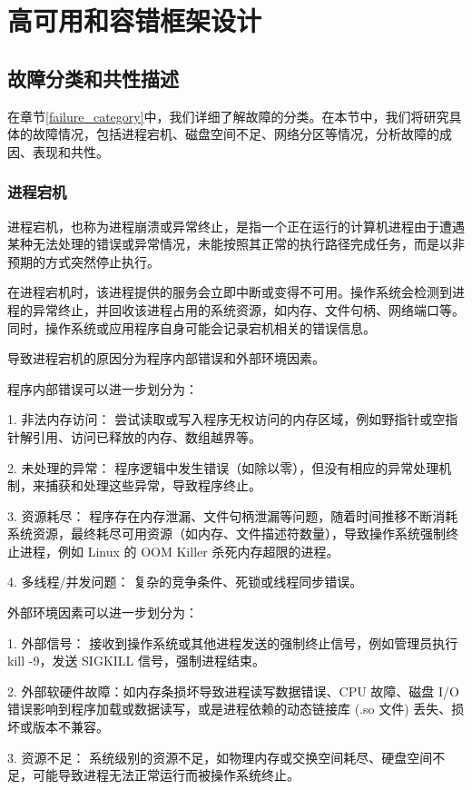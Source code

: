 
\chapter{高可用和容错框架设计}


\section{故障分类和共性描述}

在章节\ref{failure_category}中，我们详细了解故障的分类。在本节中，我们将研究具体的故障情况，包括进程宕机、磁盘空间不足、网络分区等情况，分析故障的成因、表现和共性。

\subsection{进程宕机}

进程宕机，也称为进程崩溃或异常终止，是指一个正在运行的计算机进程由于遭遇某种无法处理的错误或异常情况，未能按照其正常的执行路径完成任务，而是以非预期的方式突然停止执行。

在进程宕机时，该进程提供的服务会立即中断或变得不可用。操作系统会检测到进程的异常终止，并回收该进程占用的系统资源，如内存、文件句柄、网络端口等。同时，操作系统或应用程序自身可能会记录宕机相关的错误信息。

导致进程宕机的原因分为程序内部错误和外部环境因素。

程序内部错误可以进一步划分为：
 
1. 非法内存访问： 尝试读取或写入程序无权访问的内存区域，例如野指针或空指针解引用、访问已释放的内存、数组越界等。

2. 未处理的异常： 程序逻辑中发生错误（如除以零），但没有相应的异常处理机制，来捕获和处理这些异常，导致程序终止。

3. 资源耗尽： 程序存在内存泄漏、文件句柄泄漏等问题，随着时间推移不断消耗系统资源，最终耗尽可用资源（如内存、文件描述符数量），导致操作系统强制终止进程，例如 Linux 的 OOM Killer 杀死内存超限的进程。

4. 多线程/并发问题： 复杂的竞争条件、死锁或线程同步错误。

外部环境因素可以进一步划分为：

1. 外部信号： 接收到操作系统或其他进程发送的强制终止信号，例如管理员执行 kill -9，发送 SIGKILL 信号，强制进程结束。

2. 外部软硬件故障：如内存条损坏导致进程读写数据错误、CPU 故障、磁盘 I/O 错误影响到程序加载或数据读写，或是进程依赖的动态链接库 (.so 文件) 丢失、损坏或版本不兼容。

3. 资源不足： 系统级别的资源不足，如物理内存或交换空间耗尽、硬盘空间不足，可能导致进程无法正常运行而被操作系统终止。

